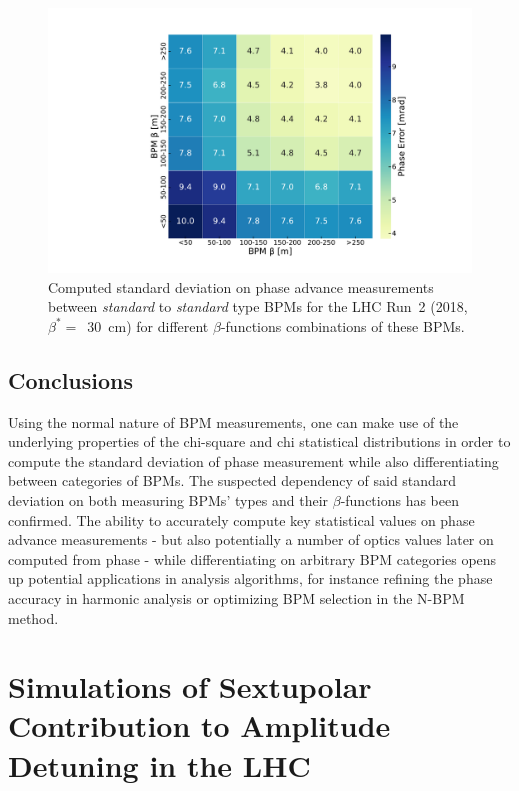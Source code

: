 \begin{figure}[!htb]
    \centering
    \includegraphics*[width=\textwidth]{Figures/Other_Studies/phase_stdev_heatmap_mrad_standard_standard.pdf}
    \caption{Computed standard deviation on phase advance measurements between \textit{standard} to \textit{standard} type BPMs for the LHC Run~\num{2} (\num{2018}, \(\beta^{\ast} =\)~\qty{30}{\centi\meter}) for different \(\beta\)-functions combinations of these BPMs.}
    \label{figure:phase_error_heatmap_standard_bpms}
\end{figure}

\subsection*{Conclusions}

Using the normal nature of BPM measurements, one can make use of the underlying properties of the chi-square and chi statistical distributions in order to compute the standard deviation of phase measurement while also differentiating between categories of BPMs.
The suspected dependency of said standard deviation on both measuring BPMs' types and their \(\beta\)-functions has been confirmed.
The ability to accurately compute key statistical values on phase advance measurements - but also potentially a number of optics values later on computed from phase - while differentiating on arbitrary BPM categories opens up potential applications in analysis algorithms, for instance refining the phase accuracy in harmonic analysis or optimizing BPM selection in the N-BPM method.

\section{Simulations of Sextupolar Contribution to Amplitude Detuning in the LHC}

